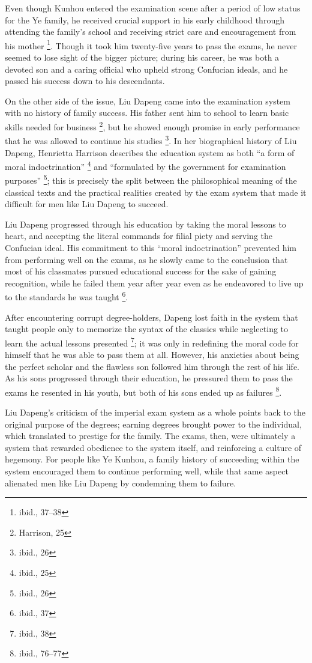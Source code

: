 Even though Kunhou entered the examination scene after a period of low status
for the Ye family, he received crucial support in his early childhood through
attending the family's school and receiving strict care and encouragement from
his mother \footnote{ibid., 37--38}. Though it took him twenty-five years to
pass the exams, he never seemed to lose sight of the bigger picture; during his
career, he was both a devoted son and a caring official who upheld strong
Confucian ideals, and he passed his success down to his descendants.

On the other side of the issue, Liu Dapeng came into the examination system
with no history of family success. His father sent him to school to learn basic
skills needed for business \footnote{Harrison, 25}, but he showed enough
promise in early performance that he was allowed to continue his studies
\footnote{ibid., 26}. In her biographical history of Liu Dapeng, Henrietta
Harrison describes the education system as both ``a form of moral
indoctrination'' \footnote{ibid., 25} and ``formulated by the government for
examination purposes'' \footnote{ibid., 26}; this is precisely the split
between the philosophical meaning of the classical texts and the practical
realities created by the exam system that made it difficult for men like Liu Dapeng to succeed.

Liu Dapeng progressed through his education by taking the moral lessons to heart,
and accepting the literal commands for filial piety and serving the Confucian
ideal. His commitment to this ``moral indoctrination'' prevented him from
performing well on the exams, as he slowly came to the conclusion that most of
his classmates pursued educational success for the sake of gaining
recognition, while he failed them year after year even as he endeavored to live
up to the standards he was taught \footnote{ibid., 37}.

After encountering corrupt degree-holders, Dapeng lost faith in the system that
taught people only to memorize the syntax of the classics while neglecting to
learn the actual lessons presented \footnote{ibid., 38}; it was only in
redefining the moral code for himself that he was able to pass them at all.
However, his anxieties about being the perfect scholar and the flawless son
followed him through the rest of his life. As his sons progressed through their
education, he pressured them to pass the exams he resented in his youth, but
both of his sons ended up as failures \footnote{ibid., 76--77}.

Liu Dapeng's criticism of the imperial exam system as a whole points back to the
original purpose of the degrees; earning degrees brought power to the
individual, which translated to prestige for the family. The exams, then, were
ultimately a system that rewarded obedience to the system itself, and
reinforcing a culture of hegemony. For people like Ye Kunhou, a family history
of succeeding within the system encouraged them to continue performing well,
while that same aspect alienated men like Liu Dapeng by condemning
them to failure.
